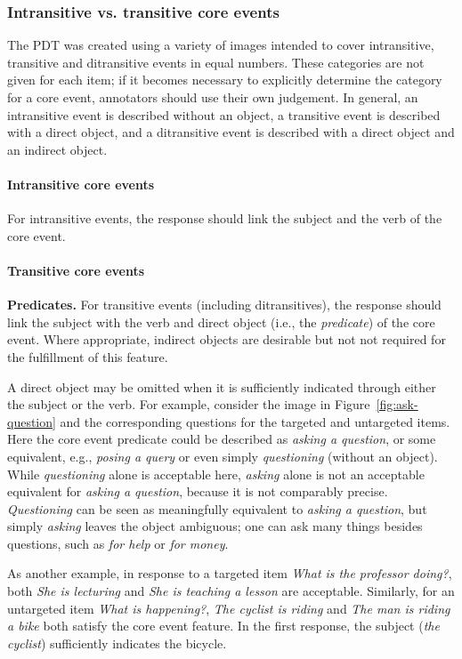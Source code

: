 \documentclass[12pt]{article}
\begin{document}
\subsubsection{Intransitive vs. transitive core events} The PDT was created using a variety of images intended to cover intransitive, transitive and ditransitive events in equal numbers. These categories are not given for each item; if it becomes necessary to explicitly determine the category for a core event, annotators should use their own judgement. In general, an intransitive event is described without an object, a transitive event is described with a direct object, and a ditransitive event is described with a direct object and an indirect object.

\paragraph{Intransitive core events} For intransitive events, the response should link the subject and the verb of the core event.

\paragraph{Transitive core events} \textbf{Predicates.} For transitive events (including ditransitives), the response should link the subject with the verb and direct object (i.e., the \textit{predicate}) of the core event. Where appropriate, indirect objects are desirable but not not required for the fulfillment of this feature. 

A direct object may be omitted when it is sufficiently indicated through either the subject or the verb. For example, consider the image in Figure~\ref{fig:ask-question} and the corresponding questions for the targeted and untargeted items. Here the core event predicate could be described as \textit{asking a question}, or some equivalent, e.g., \textit{posing a query} or even simply \textit{questioning} (without an object). While \textit{questioning} alone is acceptable here,
 \textit{asking} alone is not an acceptable equivalent for \textit{asking a question}, because it is not comparably precise. \textit{Questioning} can be seen as meaningfully equivalent to \textit{asking a question}, but simply \textit{asking} leaves the object ambiguous; one can ask many things besides questions, such as \textit{for help} or \textit{for money}.

As another example, in response to a targeted item \textit{What is the professor doing?}, both \textit{She is lecturing} and \textit{She is teaching a lesson} are acceptable. Similarly, for an untargeted item \textit{What is happening?}, \textit{The cyclist is riding} and \textit{The man is riding a bike} both satisfy the core event feature. In the first response, the subject (\textit{the cyclist}) sufficiently indicates the bicycle.
\end{document}
